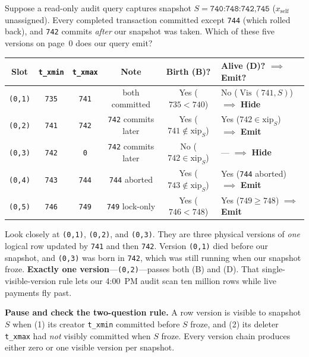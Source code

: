\begin{example}
\label{ch05:ex-visibility}
Suppose a read-only audit query captures snapshot $S = \texttt{740:748:742,745}$ ($x_{\text{self}}$ unassigned). Every completed transaction committed except \texttt{744} (which rolled back), and \texttt{742} commits \emph{after} our snapshot was taken. Which of these five versions on page~0 does our query emit?

\begin{center}
\small
\begin{tabular}{@{}cccccl@{}}
\toprule
\textbf{Slot} & \texttt{t\_xmin} & \texttt{t\_xmax} & \textbf{Note} & \textbf{Birth (B)?} & \textbf{Alive (D)? $\implies$ Emit?} \\
\midrule
\texttt{(0,1)} & \texttt{735} & \texttt{741} & both committed & Yes ($735 < 740$) & No ($\operatorname{Vis}(741,S)$) $\implies$ \textbf{Hide} \\
\texttt{(0,2)} & \texttt{741} & \texttt{742} & \texttt{742} commits later & Yes ($741 \notin \mathrm{xip}_S$) & Yes ($742 \in \mathrm{xip}_S$) $\implies$ \textbf{Emit} \\
\texttt{(0,3)} & \texttt{742} & \texttt{0} & \texttt{742} commits later & No ($742 \in \mathrm{xip}_S$) & --- $\implies$ \textbf{Hide} \\
\texttt{(0,4)} & \texttt{743} & \texttt{744} & \texttt{744} aborted & Yes ($743 \notin \mathrm{xip}_S$) & Yes (\texttt{744} aborted) $\implies$ \textbf{Emit} \\
\texttt{(0,5)} & \texttt{746} & \texttt{749} & \texttt{749} lock-only & Yes ($746 < 748$) & Yes ($749 \ge 748$) $\implies$ \textbf{Emit} \\
\bottomrule
\end{tabular}
\end{center}

Look closely at \texttt{(0,1)}, \texttt{(0,2)}, and \texttt{(0,3)}. They are three physical versions of \emph{one} logical row updated by \texttt{741} and then \texttt{742}. Version \texttt{(0,1)} died before our snapshot, and \texttt{(0,3)} was born in \texttt{742}, which was still running when our snapshot froze. \textbf{Exactly one version}---\texttt{(0,2)}---passes both (B) and (D). That single-visible-version rule lets our 4:00~PM audit scan ten million rows while live payments fly past.
\end{example}

\begin{recoverybox}
\textbf{Pause and check the two-question rule.} A row version is visible to snapshot $S$ when (1) its creator \texttt{t\_xmin} committed before $S$ froze, and (2) its deleter \texttt{t\_xmax} had \emph{not} visibly committed when $S$ froze. Every version chain produces either zero or one visible version per snapshot.
\end{recoverybox}

